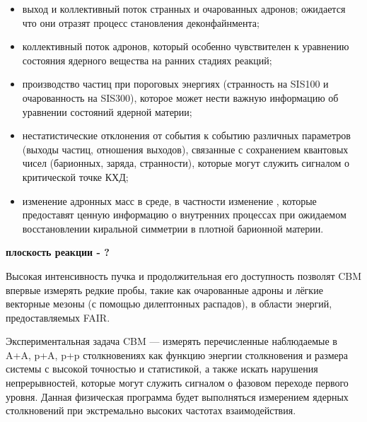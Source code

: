 \begin{itemize}
\item выход и коллективный поток странных и очарованных адронов; ожидается что они отразят процесс становления деконфайнмента;
\item коллективный поток адронов, который особенно чувствителен к уравнению состояния ядерного вещества на ранних стадиях реакций;
\item производство частиц при пороговых энергиях (странность на SIS100 и очарованность на SIS300), которое может нести важную информацию об уравнении состояний ядерной материи;
\item нестатистические отклонения от события к событию различных параметров (выходы частиц, отношения выходов), связанные с сохранением квантовых чисел (барионных, заряда, странности), которые могут служить сигналом о критической точке КХД;
\item изменение адронных масс в среде, в частности изменение \todo, которые предоставят ценную информацию о внутренних процессах при ожидаемом восстановлении киральной симметрии в плотной барионной материи.
\end{itemize}

\todo \textbf{плоскость реакции - ?}

Высокая интенсивность пучка и продолжительная его доступность позволят CBM впервые измерять редкие пробы, такие как очарованные адроны и лёгкие векторные мезоны (с помощью дилептонных распадов), в области энергий, предоставляемых FAIR.

Экспериментальная задача CBM --- измерять перечисленные наблюдаемые в A+A, p+A, p+p столкновениях как функцию энергии столкновения и размера системы с высокой точностью и статистикой, а также искать нарушения непрерывностей, которые могут служить сигналом о фазовом переходе первого уровня. Данная физическая программа будет выполняться измерением ядерных столкновений при экстремально высоких частотах взаимодействия.
